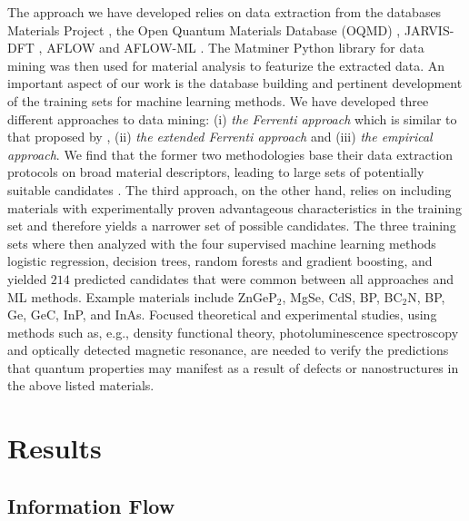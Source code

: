 \documentclass[superscriptaddress,unsortedaddress,
 amsmath,amssymb,
 aps,
]{revtex4-2}
\begin{document}
The approach we have developed relies on data extraction from the databases Materials Project \cite{Jain2013,Jain2018}, the Open Quantum Materials Database (OQMD) \cite{Saal2013, Kirklin2015}, JARVIS-DFT \cite{Choudhary2020}, AFLOW \cite{Curtarolo2012, Curtarolo2012a, Calderon2015} and AFLOW-ML \cite{Isayev2017}. 
The Matminer Python library for data mining \cite{Ward2018} was then used for material analysis to featurize the extracted data. An important aspect of our work is the database building and pertinent development of the training sets for machine learning methods. We have developed three different approaches to data mining: (i) \emph{the Ferrenti approach} which is similar to that proposed by \citeauthor{Ferrenti2020} \cite{Ferrenti2020}, (ii) 
\emph{the extended Ferrenti approach} and (iii) \emph{the empirical approach}. We find that the former two methodologies base their data extraction protocols on broad material descriptors, leading to large sets of potentially suitable candidates \cite{Mehta2019,Hastie2009}. The third approach, on the other hand, relies on including materials with experimentally proven advantageous characteristics in the training set and therefore yields a narrower set of possible candidates. The three training sets where then analyzed with the four supervised machine learning methods logistic regression, decision trees, random forests and gradient boosting, and yielded $214$ predicted candidates that were common between all approaches and ML methods. 
Example materials include ZnGeP$_2$, MgSe, CdS, BP, BC$_2$N, BP, Ge, GeC, InP, and InAs. 
Focused theoretical and experimental studies, using methods such as, e.g., density functional theory, photoluminescence spectroscopy and optically detected magnetic resonance, are needed to verify the predictions that quantum properties may manifest as a result of defects or nanostructures in the above listed materials. 

\section*{Results}

\subsection*{Information Flow} 
\end{document}
